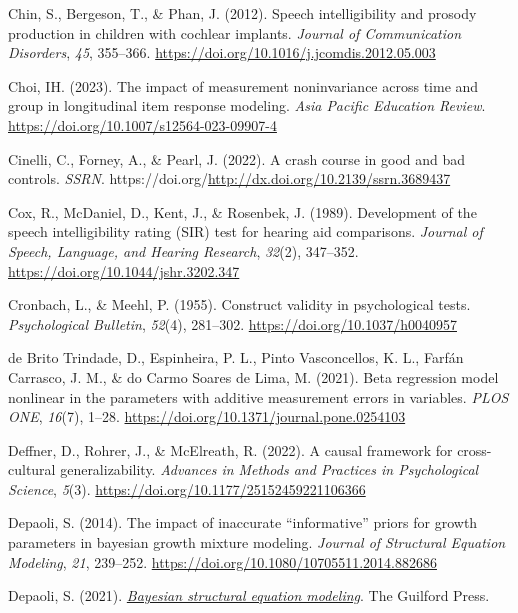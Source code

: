 \documentclass[
]{agujournal2019}
\newlength{\cslhangindent}
\newenvironment{CSLReferences}[2] %
 {\begin{list}{}{%
  \setlength{\itemindent}{0pt}
  \setlength{\leftmargin}{0pt}
  \setlength{\parsep}{0pt}
  \ifodd #1
   \setlength{\leftmargin}{\cslhangindent}
   \setlength{\itemindent}{-1\cslhangindent}
  \fi
  \setlength{\itemsep}{#2\baselineskip}}}
 {\end{list}}
\begin{document}
\begin{CSLReferences}{1}{0}
Chin, S., Bergeson, T., \& Phan, J. (2012). Speech intelligibility and
prosody production in children with cochlear implants. \emph{Journal of
Communication Disorders}, \emph{45}, 355--366.
\url{https://doi.org/10.1016/j.jcomdis.2012.05.003}

Choi, IH. (2023). The impact of measurement noninvariance across time
and group in longitudinal item response modeling. \emph{Asia Pacific
Education Review}. \url{https://doi.org/10.1007/s12564-023-09907-4}

Cinelli, C., Forney, A., \& Pearl, J. (2022). A crash course in good and
bad controls. \emph{SSRN}.
https://doi.org/\url{http://dx.doi.org/10.2139/ssrn.3689437}

Cox, R., McDaniel, D., Kent, J., \& Rosenbek, J. (1989). Development of
the speech intelligibility rating (SIR) test for hearing aid
comparisons. \emph{Journal of Speech, Language, and Hearing Research},
\emph{32}(2), 347--352. \url{https://doi.org/10.1044/jshr.3202.347}

Cronbach, L., \& Meehl, P. (1955). Construct validity in psychological
tests. \emph{Psychological Bulletin}, \emph{52}(4), 281--302.
\url{https://doi.org/10.1037/h0040957}

de Brito Trindade, D., Espinheira, P. L., Pinto Vasconcellos, K. L.,
Farfán Carrasco, J. M., \& do Carmo Soares de Lima, M. (2021). Beta
regression model nonlinear in the parameters with additive measurement
errors in variables. \emph{PLOS ONE}, \emph{16}(7), 1--28.
\url{https://doi.org/10.1371/journal.pone.0254103}

Deffner, D., Rohrer, J., \& McElreath, R. (2022). A causal framework for
cross-cultural generalizability. \emph{Advances in Methods and Practices
in Psychological Science}, \emph{5}(3).
\url{https://doi.org/10.1177/25152459221106366}

Depaoli, S. (2014). The impact of inaccurate {``informative''} priors
for growth parameters in bayesian growth mixture modeling. \emph{Journal
of Structural Equation Modeling}, \emph{21}, 239--252.
\url{https://doi.org/10.1080/10705511.2014.882686}

Depaoli, S. (2021). \emph{\href{}{Bayesian structural equation
modeling}}. The Guilford Press.


\end{CSLReferences}
\end{document}
